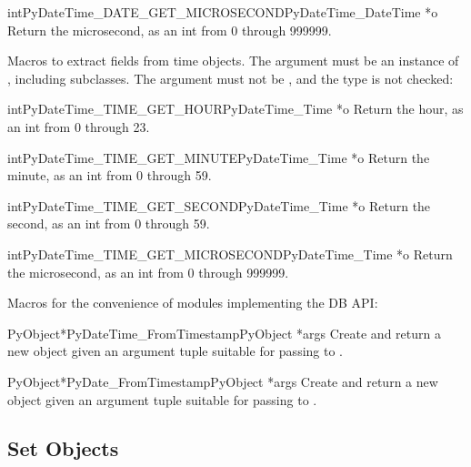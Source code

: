 \begin{cfuncdesc}{int}{PyDateTime_DATE_GET_MICROSECOND}{PyDateTime_DateTime *o}
  Return the microsecond, as an int from 0 through 999999.
\end{cfuncdesc}

Macros to extract fields from time objects.  The argument must be an
instance of , including subclasses.
The argument must not be \NULL{}, and the type is not checked:

\begin{cfuncdesc}{int}{PyDateTime_TIME_GET_HOUR}{PyDateTime_Time *o}
  Return the hour, as an int from 0 through 23.
\end{cfuncdesc}

\begin{cfuncdesc}{int}{PyDateTime_TIME_GET_MINUTE}{PyDateTime_Time *o}
  Return the minute, as an int from 0 through 59.
\end{cfuncdesc}

\begin{cfuncdesc}{int}{PyDateTime_TIME_GET_SECOND}{PyDateTime_Time *o}
  Return the second, as an int from 0 through 59.
\end{cfuncdesc}

\begin{cfuncdesc}{int}{PyDateTime_TIME_GET_MICROSECOND}{PyDateTime_Time *o}
  Return the microsecond, as an int from 0 through 999999.
\end{cfuncdesc}

Macros for the convenience of modules implementing the DB API:

\begin{cfuncdesc}{PyObject*}{PyDateTime_FromTimestamp}{PyObject *args}
  Create and return a new  object given an argument
  tuple suitable for passing to .
\end{cfuncdesc}

\begin{cfuncdesc}{PyObject*}{PyDate_FromTimestamp}{PyObject *args}
  Create and return a new  object given an argument
  tuple suitable for passing to .
\end{cfuncdesc}


\subsection{Set Objects \label{setObjects}}

